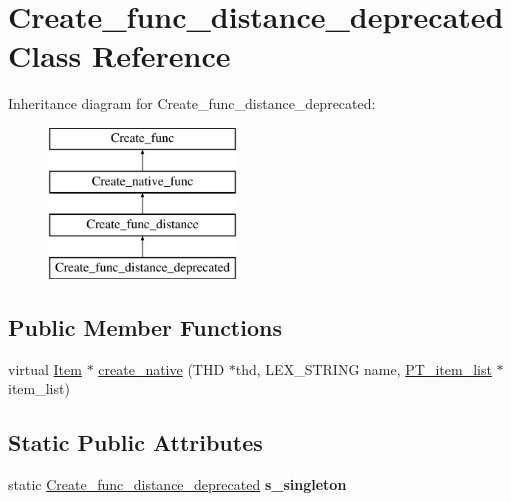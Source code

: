 \hypertarget{classCreate__func__distance__deprecated}{}\section{Create\+\_\+func\+\_\+distance\+\_\+deprecated Class Reference}
\label{classCreate__func__distance__deprecated}
Inheritance diagram for Create\+\_\+func\+\_\+distance\+\_\+deprecated\+:\begin{figure}[H]
\begin{center}
\leavevmode
\includegraphics[height=4.000000cm]{classCreate__func__distance__deprecated}
\end{center}
\end{figure}
\subsection*{Public Member Functions}
\begin{DoxyCompactItemize}
\item 
virtual \mbox{\hyperlink{classItem}{Item}} $\ast$ \mbox{\hyperlink{classCreate__func__distance__deprecated_a0ede2268cdcde449bf54ed374e0027ad}{create\+\_\+native}} (T\+HD $\ast$thd, L\+E\+X\+\_\+\+S\+T\+R\+I\+NG name, \mbox{\hyperlink{classPT__item__list}{P\+T\+\_\+item\+\_\+list}} $\ast$item\+\_\+list)
\end{DoxyCompactItemize}
\subsection*{Static Public Attributes}
\begin{DoxyCompactItemize}
\item 
\mbox{\label{classCreate__func__distance__deprecated_a26370a41567868db2e6401bcb3661211}} 
static \mbox{\hyperlink{classCreate__func__distance__deprecated}{Create\+\_\+func\+\_\+distance\+\_\+deprecated}} {\bfseries s\+\_\+singleton}
\end{DoxyCompactItemize}

